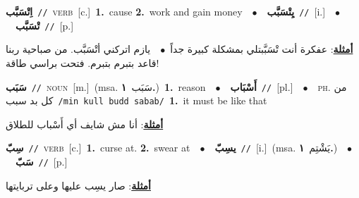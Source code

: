 \documentclass[10pt,a4paper,twoside]{article} %
\begin{document}
\begin{multicols}{2}
{{\setlength\topsep{0pt}\textbf{\foreignlanguage{arabic}{اِتْسَبَّب}}\ {\color{gray}\texttt{//}\color{black}}\ \textsc{verb}\ [c.]\ \textbf{1.}~cause  \textbf{2.}~work and gain money\ \ $\bullet$\ \ \setlength\topsep{0pt}\textbf{\foreignlanguage{arabic}{يِتْسَبَّب}}\ {\color{gray}\texttt{//}\color{black}}\ [i.]\ \ $\bullet$\ \ \setlength\topsep{0pt}\textbf{\foreignlanguage{arabic}{تْسَبَّب}}\ {\color{gray}\texttt{//}\color{black}}\ [p.]\  \begin{flushright}\color{gray}\foreignlanguage{arabic}{\textbf{\underline{\foreignlanguage{arabic}{أمثلة}}}: عفكرة أنت تْسَبَّبتلي بمشكلة كبيرة جداً\ $\bullet$\ \  يازم اتركني أتْسَبَّب. من صباحية ربنا قاعد بتبرم بتبرم. فتحت براسي طاقة!}\end{flushright}\color{black}} \vspace{2mm}

{\setlength\topsep{0pt}\textbf{\foreignlanguage{arabic}{سَبَب}}\ {\color{gray}\texttt{//}\color{black}}\ \textsc{noun}\ [m.]\ \color{gray}(msa. \foreignlanguage{arabic}{سَبَب}~\foreignlanguage{arabic}{\textbf{١.}})\color{black}\ \textbf{1.}~reason\ \ $\bullet$\ \ \setlength\topsep{0pt}\textbf{\foreignlanguage{arabic}{أَسْبَاب}}\ {\color{gray}\texttt{//}\color{black}}\ [pl.]\ \ $\bullet$\ \ \textsc{ph.} \color{gray} \foreignlanguage{arabic}{من كل بد سبب}\color{black}\ {\color{gray}\texttt{/{\sffamily min kull budd sabab}/}\color{black}}\ \textbf{1.}~it must be like that\  \begin{flushright}\color{gray}\foreignlanguage{arabic}{\textbf{\underline{\foreignlanguage{arabic}{أمثلة}}}: أنا مش شايف أي أَسْباب للطلاق}\end{flushright}\color{black}} \vspace{2mm}

{\setlength\topsep{0pt}\textbf{\foreignlanguage{arabic}{سِبّ}}\ {\color{gray}\texttt{//}\color{black}}\ \textsc{verb}\ [c.]\ \textbf{1.}~curse at.  \textbf{2.}~swear at\ \ $\bullet$\ \ \setlength\topsep{0pt}\textbf{\foreignlanguage{arabic}{يسِبّ}}\ {\color{gray}\texttt{//}\color{black}}\ [i.]\ \color{gray}(msa. \foreignlanguage{arabic}{يَشْتِم}~\foreignlanguage{arabic}{\textbf{١.}})\color{black}\ \ $\bullet$\ \ \setlength\topsep{0pt}\textbf{\foreignlanguage{arabic}{سَبّ}}\ {\color{gray}\texttt{//}\color{black}}\ [p.]\  \begin{flushright}\color{gray}\foreignlanguage{arabic}{\textbf{\underline{\foreignlanguage{arabic}{أمثلة}}}: صار يسِب عليها وعلى تربايتها}\end{flushright}\color{black}} \vspace{2mm}

}
\end{multicols}
\end{document}
